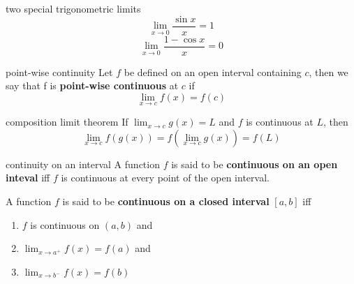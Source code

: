 \documentclass[avery5371,grid]{flashcards}
\begin{document}
\begin{flashcard}[Theorem]{two special trigonometric limits}
\begin{equation*}
\lim_{x \rightarrow 0} \dfrac{\sin x}{x} = 1
\end{equation*}
\bigskip
\begin{equation*}
\lim_{x \rightarrow 0} \dfrac{1-\cos x}{x} = 0
\end{equation*}
\end{flashcard}

\begin{flashcard}[Definition]{point-wise continuity}
Let $f$ be defined on an open interval containing $c$, then 
we say that f is \textbf{point-wise continuous} at $c$ if 
\begin{equation*}
\lim_{x \rightarrow c} f(x) = f(c)
\end{equation*}
\end{flashcard}

\begin{flashcard}[Theorem]{composition limit theorem}
If $\lim_{x \rightarrow c} g(x) = L$ and $f$ is continuous at $L$, then
\begin{equation*}
\lim_{x \rightarrow c} f(g(x)) = f(\lim_{x \rightarrow c} g(x)) = f(L)
\end{equation*}
\end{flashcard}

\begin{flashcard}[Definition]{continuity on an interval}
A function $f$ is said to be \textbf{continuous on an open inteval}
iff $f$ is continuous at every point of the open interval.

A function $f$ is said to be \textbf{continuous on a closed interval}
$[a,b]$ iff
\begin{enumerate}
\item $f$ is continuous on $(a,b)$ and
\item $\lim_{x \rightarrow a^{+}} f(x) = f(a)$ and
\item $\lim_{x \rightarrow b^{-}} f(x) = f(b)$
\end{enumerate}
\end{flashcard}
\end{document}
